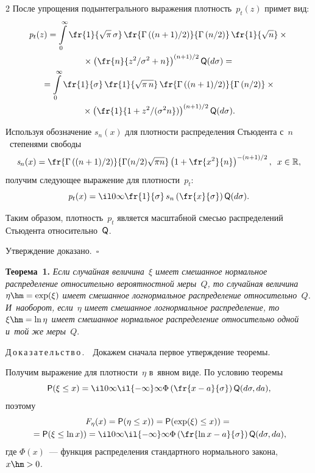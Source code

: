 \begin{multicols}{2}
После упрощения подынтегрального выражения плотность~$\mathit{p}_t(z)$ примет вид:
\begin{multline*}
\mathit{p}_t(z) = \int\limits_0^\infty \fr{1}{\sqrt{\pi} \, \sigma} \,
\fr{\Gamma\left(({n+1})/{2}\right)} {\Gamma\left({n}/{2}\right)} \, 
 \fr{1}{\sqrt{n}}\times{}\\
 {}\times \left(\fr{n}{{z^2}/{\sigma^2}+n}\right)^{({n+1})/{2}}  {\sf Q} (d\sigma) ={}  \\
{}= \int\limits_0^\infty \fr{1}{\sigma} \, \fr{1}{\sqrt{\pi \, n}} \,
\fr{\Gamma\left(({n+1})/{2}\right)} {\Gamma\left({n}/{2}\right)}\times{}\\
{}\times
 \left(\fr{1}{1+{z^2}/({\sigma^2 n}})\right)^{({n+1})/{2}}  {\sf Q} (d\sigma).
\end{multline*}

Используя обозначение $\mathit{s}_n(x)$ для плотности распределения Стьюдента с~$n$~степенями свободы
$$
\mathit{s}_n(x) = \fr{\Gamma\left(({n+1})/{2}\right)}
{\Gamma({n}/{2})\sqrt{\pi n}}\left(1 + \fr{x^2}{n}\right)^{-({n+1})/{2}}, \enskip x \in \mathbb{R},
$$
получим следующее выражение для плотности~$\mathit{p}_t$:
$$
\mathit{p}_t(x) = \il 0 \infty \fr{1}{\sigma} \, s_n\left(\fr{x}{\sigma}\right) {\sf Q} (d\sigma).
$$


Таким образом, плотность~$\mathit{p}_t$ является масштабной смесью распределений Стьюдента 
относительно~${\sf Q}$.

Утверждение доказано.~\hfill$\square$


\smallskip

\noindent
\textbf{Теорема~1.}
\textit{Если случайная величина~$\xi$ имеет смешанное нормальное распределение 
относительно вероятностной меры~$Q$, то случайная величина 
$\eta\hm=\exp(\xi)$ имеет смешанное логнормальное распределение относительно~$Q$. 
И~наоборот, если~$\eta$ имеет смешанное логнормальное распределение, то $\xi\hm=\ln 
\eta$ имеет смешанное нормальное распределение относительно одной и~той же меры~$Q$}.


\smallskip

\noindent
Д\,о\,к\,а\,з\,а\,т\,е\,л\,ь\,с\,т\,в\,о\,.\ \
Докажем сначала первое утверждение теоремы.

Получим выражение для плотности~$\eta$ в~явном виде. По условию теоремы
$$
{\sf P} (\xi \le x) = \il 0 \infty  \il {-\infty} \infty \Phi \left(\fr{ x-a}{\sigma} \right) {\sf Q}
 (d\sigma, da),
$$
поэтому
\begin{multline*}
\mathit{F}_\eta(x) = {\sf P} (\eta \le x)) = {\sf P} (\exp(\xi) \le x)) = {}\\
{}={\sf P} (\xi \le \ln x))
=\il 0 \infty  \il {-\infty} \infty \Phi \left(\fr{\ln x-a}{\sigma} \right) {\sf Q} (d\sigma, da),
\end{multline*}
где $\Phi(x)$~--- функция распределения стандартного нормального закона, $x\hm>0$.


\end{multicols}
